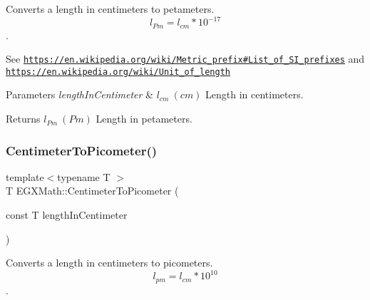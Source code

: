 Converts a length in centimeters to petameters. \[ l_{Pm}=l_{cm} * 10^{-17} \]. 

See \href{https://en.wikipedia.org/wiki/Metric_prefix#List_of_SI_prefixes}{\tt https\+://en.\+wikipedia.\+org/wiki/\+Metric\+\_\+prefix\#\+List\+\_\+of\+\_\+\+S\+I\+\_\+prefixes} and \href{https://en.wikipedia.org/wiki/Unit_of_length}{\tt https\+://en.\+wikipedia.\+org/wiki/\+Unit\+\_\+of\+\_\+length} 
\begin{DoxyParams}{Parameters}
{\em length\+In\+Centimeter} & $ l_{cm}\ (cm)$ Length in centimeters. \\
\hline
\end{DoxyParams}
\begin{DoxyReturn}{Returns}
$ l_{Pm}\ (Pm)$ Length in petameters. 
\end{DoxyReturn}
\mbox{\label{group___e_g_x_math-_conversions-_length_conversions-_s_i-_centimeter-_s_i_ga7e2851b0052f1b135a84aa860495e4ba}} 
\subsubsection{\texorpdfstring{Centimeter\+To\+Picometer()}{CentimeterToPicometer()}}
{\footnotesize\ttfamily template$<$typename T $>$ \\
T E\+G\+X\+Math\+::\+Centimeter\+To\+Picometer (\begin{DoxyParamCaption}\item[{const T}]{length\+In\+Centimeter }\end{DoxyParamCaption})}



Converts a length in centimeters to picometers. \[ l_{pm}=l_{cm} * 10^{10} \]. 

